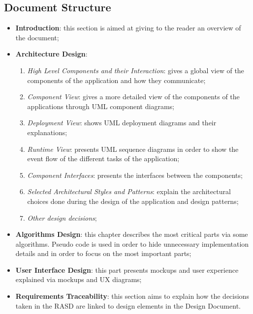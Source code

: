 \documentclass[a4paper]{article}
\begin{document}
\subsection{Document Structure}
\begin{itemize}
    \item \textbf{Introduction}: this section is aimed at giving to the reader an overview of the document;

\item \textbf{Architecture Design}:
\begin{enumerate}
    \item \textit{High Level Components and their Interaction}: gives a global view of the components of the application and how they communicate;

    \item \textit{Component View}: gives a more detailed view of the components of the applications through UML component diagrams;

    \item \textit{Deployment View}: shows UML deployment diagrams and their explanations;

    \item \textit{Runtime View}: presents UML sequence diagrams in order to show the event flow of the different tasks of the application;

    \item \textit{Component Interfaces}: presents the interfaces between the components;

    \item \textit{Selected Architectural Styles and Patterns}: explain the architectural choices done during the design of the application and design patterns;

    \item \textit{Other design decisions};
\end{enumerate}

\item \textbf{Algorithms Design}: this chapter describes the most critical parts via some algorithms. Pseudo code is used in order to hide unnecessary implementation details and in order to focus on the most important parts;

\item \textbf{User Interface Design}: this part presents mockups and user experience explained via mockups and UX diagrams;

\item \textbf{Requirements Traceability}: this section aims to explain how the decisions taken in the RASD are linked to design elements in the Design Document.
\end{itemize}
\end{document}

